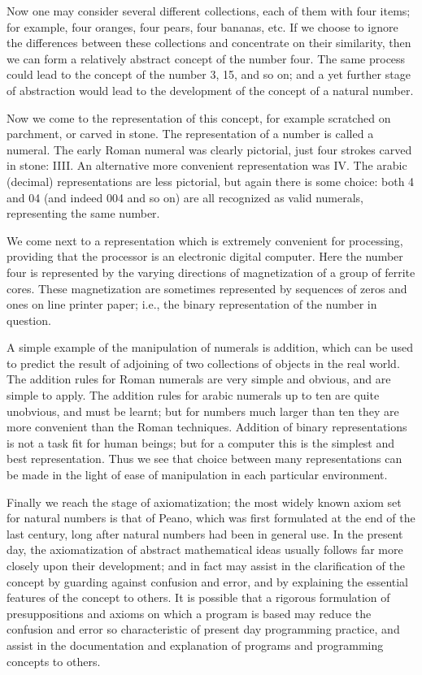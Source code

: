 Now one may consider several different collections, each of them with four items; for example, four oranges, four pears, four bananas, etc. If we choose to ignore the differences between these collections and concentrate on their similarity, then we can form a relatively abstract concept of the number four. The same process could lead to the concept of the number 3, 15, and so on; and a yet further stage of abstraction would lead to the development of the concept of a natural number.

Now we come to the representation of this concept, for example scratched on parchment, or carved in stone. The representation of a number is called a numeral. The early Roman numeral was clearly pictorial, just four strokes carved in stone: IIII. An alternative more convenient representation was IV. The arabic (decimal) representations are less pictorial, but again there is some choice: both 4 and 04 (and indeed 004 and so on) are all recognized as valid numerals, representing the same number.

We come next to a representation which is extremely convenient for processing, providing that the processor is an electronic digital computer. Here the number four is represented by the varying directions of magnetization of a group of ferrite cores. These magnetization are sometimes represented by sequences of zeros and ones on line printer paper; i.e., the binary representation of the number in question.

A simple example of the manipulation of numerals is addition, which can be used to predict the result of adjoining of two collections of objects in the real world. The addition rules for Roman numerals are very simple and obvious, and are simple to apply. The addition rules for arabic numerals up to ten are quite unobvious, and must be learnt; but for numbers much larger than ten they are more convenient than the Roman techniques. Addition of binary representations is not a task fit for human beings; but for a computer this is the simplest and best representation. Thus we see that choice between many representations can be made in the light of ease of manipulation in each particular environment.

Finally we reach the stage of axiomatization; the most widely known axiom set for natural numbers is that of Peano, which was first formulated at the end of the last century, long after natural numbers had been in general use. In the present day, the axiomatization of abstract mathematical ideas usually follows far more closely upon their development; and in fact may assist in the clarification of the concept by guarding against confusion and error, and by explaining the essential features of the concept to others. It is possible that a rigorous formulation of presuppositions and axioms on which a program is based may reduce the confusion and error so characteristic of present day programming practice, and assist in the documentation and explanation of programs and programming concepts to others.

